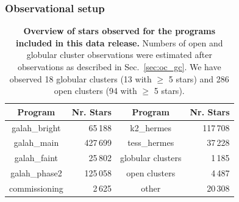 \documentclass[
  journal=pasa,
  manuscript=research-paper, %
  year=2023,
  volume=37
]{cup-journal}
\begin{document}
\subsubsection{Observational setup}

\begin{table}
\centering
 \caption{\textbf{Overview of stars observed for the programs included in this data release.} Numbers of open and globular cluster observations were estimated after observations as described in Sec.~\ref{sec:oc_gc}. We have observed 18 globular clusters (13 with $\geq$ 5 stars) and 286 open clusters (94 with $\geq$ 5 stars).}
\label{tab:field_ids}
\begin{tabular}{crcr}
\hline \hline
Program & Nr. Stars & Program & Nr. Stars \\
\hline
galah\_bright & 65\,188 & 
k2\_hermes & 117\,708\\
galah\_main & 427\,699 & 
tess\_hermes & 37\,228\\
galah\_faint & 25\,802 & 
globular clusters & 1\,185\\
galah\_phase2 & 125\,058 & 
open clusters & 4\,487\\
commissioning & 2\,625 & 
other & 20\,308\\
  \hline
 \end{tabular}
\end{table}
\end{document}
